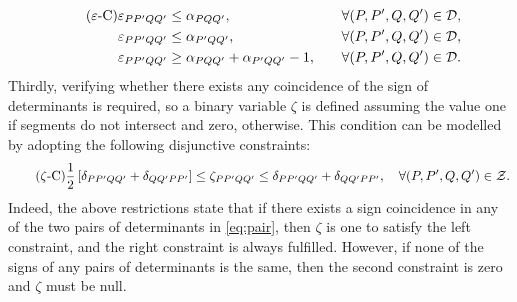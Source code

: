 \documentclass[a4paper,  review, authoryear, 1p.]{elsarticle}
\newcommand{\VB}{{V^{}_{\mathcal B}}}
\newcommand{\CV}[1]{{\color{blue}#1}}
\begin{document}
		\CV{
		\begin{align*}\tag{$\varepsilon$-C}\label{eq:varepsilonC}
			\varepsilon_{PP'QQ'} & \leq \alpha_{PQQ'},&\quad\forall (P,P',Q,Q')\in\mathcal D,\\
			\varepsilon_{PP'QQ'} & \leq \alpha_{P'QQ'},&\quad\forall (P,P',Q,Q')\in\mathcal D,\\
			\varepsilon_{PP'QQ'} & \geq \alpha_{PQQ'} + \alpha_{P'QQ'} - 1,&\quad\forall (P,P',Q,Q')\in\mathcal D.
		\end{align*}}
	\newcommand{\zetacheck}[4]{\zeta_{#1#2#3#4}}
	Thirdly, verifying whether there exists any coincidence of the sign of determinants is required, so a binary variable $\zeta$ is defined  assuming the value one if segments do not intersect and zero, otherwise. This condition can be modelled by adopting the following disjunctive constraints:
	\CV{
	\begin{equation*}\tag{$\zeta$-C}\label{eq:zetaC}
		\frac{1}{2}\left[\deltamas{P}{P'}{Q}{Q'}+\deltamas{Q}{Q'}{P}{P'}\right]\leq\zetacheck{P}{P'}{Q}{Q'}\leq \deltamas{P}{P'}{Q}{Q'}+\deltamas{Q}{Q'}{P}{P'},\quad\forall (P,P',Q,Q')\in \mathcal Z.
	\end{equation*}}
	Indeed, the above restrictions state that if there exists a sign coincidence in any of the two pairs of determinants in \eqref{eq:pair}, then $\zeta$ is one to satisfy the left constraint, and the right constraint is always fulfilled. However, if none of the signs of any pairs of determinants is the same, then the second constraint is zero and $\zeta$ must be null.
	
\end{document}
